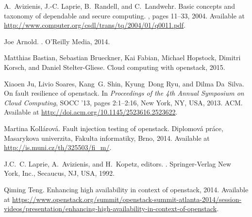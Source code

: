 \documentclass[conference]{IEEEtran}
\begin{document}
%
%
%
\begin{thebibliography}{1}

A.~Avizienis, J.-C. Laprie, B.~Randell, and C.~Landwehr.
\newblock Basic concepts and taxonomy of dependable and secure computing.
, pages
  11--33, 2004.
\newblock Available at
  \url{http://www.computer.org/csdl/trans/tq/2004/01/q0011.pdf}.

Joe Arnold.
.
\newblock O'Reilly Media, 2014.

Matthias Bastian, Sebastian Brueckner, Kai Fabian, Michael Hopstock, Dimitri
  Korsch, and Daniel Stelter-Gliese.
\newblock Cloud computing with openstack, 2015.

Xiaoen Ju, Livio Soares, Kang~G. Shin, Kyung~Dong Ryu, and Dilma Da~Silva.
\newblock On fault resilience of openstack.
\newblock In {\em Proceedings of the 4th Annual Symposium on Cloud Computing},
  SOCC '13, pages 2:1--2:16, New York, NY, USA, 2013. ACM.
\newblock Available at \url{http://doi.acm.org/10.1145/2523616.2523622}.

Martina Kollárová.
\newblock Fault injection testing of openstack.
\newblock Diplomová práce, Masarykova univerzita, Fakulta informatiky, Brno,
  2014.
\newblock Available at \url{http://is.muni.cz/th/325503/fi_m/}.

J.C.~C. Laprie, A.~Avizienis, and H.~Kopetz, editors.
.
\newblock Springer-Verlag New York, Inc., Secaucus, NJ, USA, 1992.

Qiming Teng.
\newblock Enhancing high availability in context of openstack, 2014.
\newblock Available at
  \url{https://www.openstack.org/summit/openstack-summit-atlanta-2014/session-videos/presentation/enhancing-high-availability-in-context-of-openstack}.


\end{thebibliography}




\end{document}
